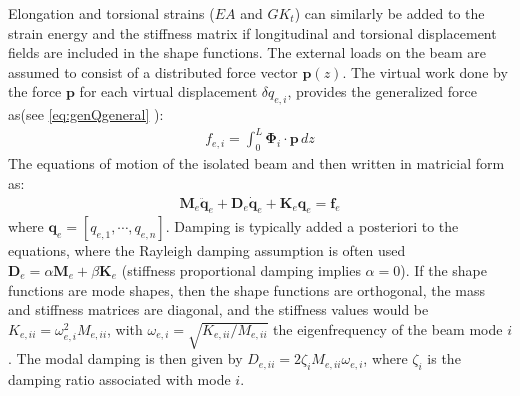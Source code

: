 \documentclass[wes, manuscript]{copernicus}
\renewcommand{\v}[1]{\boldsymbol{#1}}
\newcommand{\m}[1]{\boldsymbol{#1}}
\begin{document}
Elongation and torsional strains ($EA$ and $GK_t$) can similarly be added to the strain energy and the stiffness matrix if longitudinal and torsional displacement fields are included in the shape functions.
% 
The external loads on the beam are assumed to consist of a distributed force vector $\v{p}(z)$.
The virtual work done by the force $\v{p}$ for each virtual displacement $\delta q_{e,i}$, provides the generalized force as(see \autoref{eq:genQgeneral} ): 
\begin{align}
    f_{e,i}=\int_0^L \v{\Phi}_i\cdot \v{p}\, dz
    \label{eq:GenQBeam}
\end{align}
% 
The equations of motion of the isolated beam 
 and then written in matricial form as:
\begin{align}
   \m{M}_e \v{\ddot{q}}_e + \m{D}_e\v{\dot{q}}_e + \v{K}_e\v{q}_e = \v{f}_e
\end{align}
where $\v{q}_e=[q_{e,1},\cdots,q_{e,n}]$. 
Damping is typically added a posteriori to the equations, where the Rayleigh damping assumption is often used $\v{D}_e=\alpha\m{M}_e+\beta\m{K}_e$ (stiffness proportional damping implies $\alpha=0$).
If the shape functions are mode shapes, then the shape functions are orthogonal, the mass and stiffness matrices are diagonal, and the stiffness values would be $K_{e,ii}=\omega_{e,i}^2 M_{e,ii}$, with $\omega_{e,i}=\sqrt{K_{e,ii}/M_{e,ii}}$ the eigenfrequency of the beam mode $i$.
The modal damping is then given by $D_{e,ii}= 2 \zeta_i M_{e,ii} \omega_{e,i}$, where $\zeta_i$ is the damping ratio associated with mode $i$.
\end{document}
